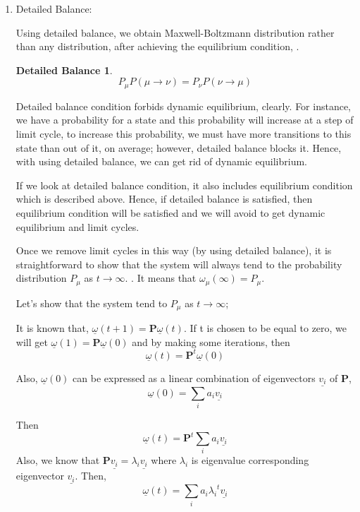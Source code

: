 \documentclass[12pt,fleqn]{report}
\begin{document}
\begin{enumerate}

\item Detailed Balance:

Using detailed balance, we obtain Maxwell-Boltzmann distribution rather than any distribution, after achieving the equilibrium condition, .

\newtheorem*{balance}{Detailed Balance}
\begin{balance}
$$ P_\mu P(\mu \rightarrow \nu) = P_\nu P(\nu \rightarrow \mu)$$
\end{balance}

Detailed balance condition forbids dynamic equilibrium, clearly. For instance, we have a probability for a state and this probability will increase at a step of limit cycle, to increase this probability, we must have more transitions to this state than out of it, on average; however, detailed balance blocks it. Hence, with using detailed balance, we can get rid of dynamic equilibrium.

If we look at detailed balance condition, it also includes equilibrium condition which is described above. Hence, if detailed balance is satisfied, then equilibrium condition will be satisfied and we will avoid to get dynamic equilibrium and limit cycles. 

Once we remove limit cycles in this way (by using detailed balance), it is straightforward to show that the system will always tend to the probability distribution $P_\mu$ as $t \rightarrow \infty $. \cite[p. 38]{newman}. It means that $\omega_\mu(\infty) = P_\mu$.

Let's show that the system tend to $P_\mu$ as $t \rightarrow \infty $;

It is known that, $  \underline{\omega}(t+1) = \textbf{P} \underline{\omega}(t)$. If t is chosen to be equal to zero, we will get  $  \underline{\omega}(1) = \textbf{P} \underline{\omega}(0)$ and by making some iterations, then
\begin{equation}
\underline{\omega}(t) = \textbf{P}^t \underline{\omega}(0)
\end{equation}

Also, $  \underline{\omega}(0) $ can be expressed as a linear combination of eigenvectors $\underline{v_i}$ of \textbf{P}, \cite[p. 66]{newman}
\begin{equation}
\underline{\omega}(0) = \sum\limits_{i} a_i\underline{v_i} 
\end{equation}


Then $$  \underline{\omega}(t) = \textbf{P}^t \sum\limits_{i} a_i\underline{v_i} $$ Also, we know that $ \textbf{P} \underline{v_i} = \lambda_i \underline{v_i} $ where $ \lambda_i $ is eigenvalue corresponding eigenvector $ \underline{v_i} $. Then, 
\begin{equation}
\underline{\omega}(t) = \sum\limits_{i} a_i {\lambda_i}^t \underline{v_i} 
\end{equation}



\end{enumerate}
\end{document}
